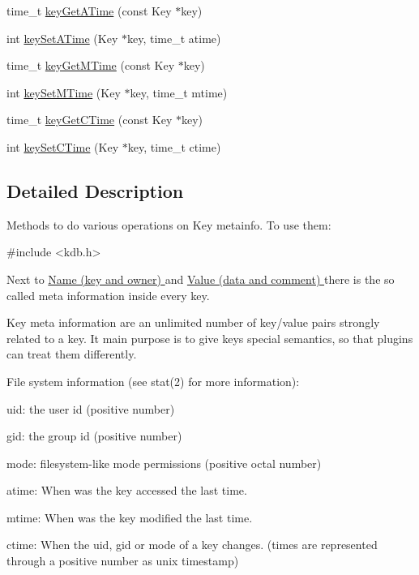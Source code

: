 \begin{DoxyCompactItemize}
\item 
time\-\_\-t \hyperlink{group__keymeta_ga6b05da399c3c78904969ef39f191b0eb}{key\-Get\-A\-Time} (const Key $\ast$key)
\item 
int \hyperlink{group__keymeta_ga995d8b84731673c88c7c01f3fed538b9}{key\-Set\-A\-Time} (Key $\ast$key, time\-\_\-t atime)
\item 
time\-\_\-t \hyperlink{group__keymeta_ga57689eb5691679071463b777ae786ae9}{key\-Get\-M\-Time} (const Key $\ast$key)
\item 
int \hyperlink{group__keymeta_ga481d8997187992fe4bbf288bc8ef4db7}{key\-Set\-M\-Time} (Key $\ast$key, time\-\_\-t mtime)
\item 
time\-\_\-t \hyperlink{group__keymeta_ga2c213c120cbe02201278ef7fb8cd94be}{key\-Get\-C\-Time} (const Key $\ast$key)
\item 
int \hyperlink{group__keymeta_ga9f502ecab8ab43f0b17220fcc95f3fa5}{key\-Set\-C\-Time} (Key $\ast$key, time\-\_\-t ctime)
\end{DoxyCompactItemize}


\subsection{Detailed Description}
Methods to do various operations on Key metainfo. To use them\-: 
\begin{DoxyCode}
\textcolor{preprocessor}{#include <kdb.h>}
\end{DoxyCode}


Next to \hyperlink{group__keyname}{Name (key and owner) } and \hyperlink{group__keyvalue}{Value (data and comment) } there is the so called meta information inside every key.

Key meta information are an unlimited number of key/value pairs strongly related to a key. It main purpose is to give keys special semantics, so that plugins can treat them differently.

File system information (see stat(2) for more information)\-:
\begin{DoxyItemize}
\item uid\-: the user id (positive number)
\item gid\-: the group id (positive number)
\item mode\-: filesystem-\/like mode permissions (positive octal number)
\item atime\-: When was the key accessed the last time.
\item mtime\-: When was the key modified the last time.
\item ctime\-: When the uid, gid or mode of a key changes. (times are represented through a positive number as unix timestamp)
\end{DoxyItemize}

